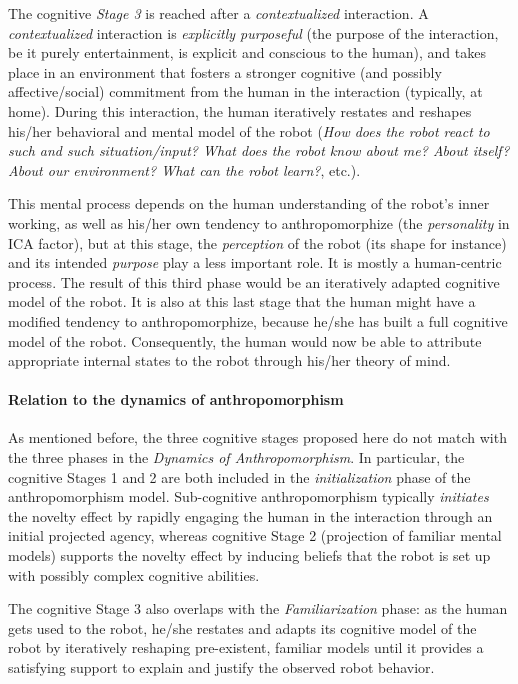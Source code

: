 \documentclass{frontiersSCNS} %
\begin{document}
The cognitive \emph{Stage 3} is reached after a \emph{contextualized} interaction.
A \emph{contextualized} interaction is \emph{explicitly purposeful} (the purpose
of the interaction, be it purely entertainment, is explicit and conscious to the
human), and takes place in an environment that fosters a stronger cognitive (and
possibly affective/social) commitment from the human in the interaction
(typically, at home). During this interaction, the human iteratively restates
and reshapes his/her behavioral and mental model of the robot (\emph{How does
the robot react to such and such situation/input?  What does the robot know
about me? About itself? About our environment? What can the robot learn?}, etc.).

This mental process depends on the human understanding of the robot's inner
working, as well as his/her own tendency to anthropomorphize (the
\emph{personality} in ICA factor), but at this stage, the \emph{perception} of
the robot (its shape for instance) and its intended \emph{purpose} play a less
important role. It is mostly a human-centric process.  The result of this third
phase would be an iteratively adapted cognitive model of the robot. It is also
at this last stage that the human might have a modified tendency to
anthropomorphize, because he/she has built a full cognitive model of the robot.
Consequently, the human would now be able to attribute appropriate internal
states to the robot through his/her theory of mind.


\paragraph{Relation to the dynamics of anthropomorphism\\}

As mentioned before, the three cognitive stages proposed here do not match with
the three phases in the \emph{Dynamics of Anthropomorphism}.  In particular, the
cognitive Stages 1 and 2 are both included in the \emph{initialization} phase of
the anthropomorphism model. Sub-cognitive anthropomorphism typically
\emph{initiates} the novelty effect by rapidly engaging the human in the
interaction through an initial projected agency, whereas cognitive Stage 2
(projection of familiar mental models) supports the novelty effect by inducing
beliefs that the robot is set up with possibly complex cognitive abilities.

The cognitive Stage 3 also overlaps with the \emph{Familiarization} phase: as
the human gets used to the robot, he/she restates and adapts its
cognitive model of the robot by iteratively reshaping pre-existent, familiar
models until it provides a satisfying support to explain and justify the
observed robot behavior.
\end{document}
